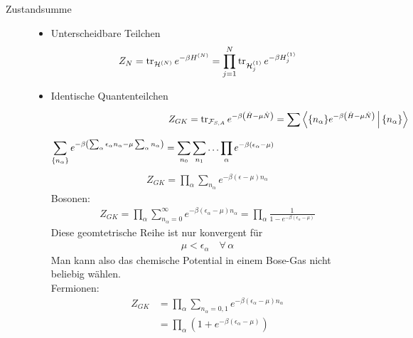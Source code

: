 \begin{description}
  \item[Zustandsumme]
    \begin{itemize}
      \item Unterscheidbare Teilchen
        \begin{align*}
          Z_N = \operatorname{tr}_{\mathcal{H}^{(N)}} e ^{- \beta H^{(N)}} = \prod_{j=1}^{N}
          \operatorname{tr}_{\mathcal{H}_j^{(1)}} e ^{-\beta H_j ^{(1)}}
        \end{align*}
      \item Identische Quantenteilchen
        \begin{align*}
          Z_{GK} = \operatorname{tr}_{\mathcal{F}_{S,A}} e ^{-\beta \left( \hat{H} - \mu  \hat{N} \right)}
           & = \sum_{}^{} \Braket{\{n_\alpha\} e ^{-\beta \left( \hat{H} - \mu \hat{N} \right)} | \{n_\alpha\} } \\
          \sum_{\{n_\alpha\}}^{} e^{-\beta \left( \sum_{\alpha}^{}
          \epsilon_\alpha n_\alpha - \mu \sum_{\alpha}^{ } n_\alpha \right)}
          = \sum_{n_0}^{} \sum_{n_1}^{} \ldots \prod_{\alpha}^{}
          e^{-\beta (\epsilon_\alpha - \mu )}
         \end{align*}
        \begin{align*}
          Z_{GK} = \prod_{\alpha}^{} \sum_{n_\alpha}^{} e^{-\beta(\epsilon-\mu) n_\alpha}
        \end{align*}
        Bosonen:
        \begin{align*}
          Z_{GK} = \prod_{\alpha}^{} \sum_{n_\alpha = 0}^{ \infty}
          e^{-\beta\left( \epsilon_\alpha - \mu  \right) n_\alpha} 
          = \prod_{\alpha}^{} 
          \frac{1}{1- e ^{-\beta(\epsilon_\alpha - \mu)}}
        \end{align*}
        Diese geomtetrische Reihe ist nur konvergent f\"ur 
        \begin{align*}
          \mu < \epsilon_\alpha \quad\forall\, \alpha
        \end{align*}
        Man kann also das chemische Potential in einem Bose-Gas nicht beliebig 
        w\"ahlen. \\
        Fermionen:
        \begin{align*}
          Z_{GK} &= \prod_{\alpha}^{} \sum_{n_\alpha=0,1}^{} e ^{-\beta(\epsilon_\alpha - \mu)n_\alpha} \\
                 & = \prod_{\alpha}^{} \left( 1 + e^{-\beta(\epsilon_\alpha - \mu)} \right)
        \end{align*}
        

\end{itemize}
\end{description}
